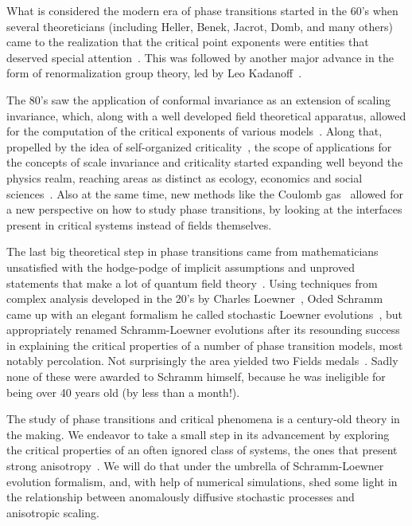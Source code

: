 What is considered the modern era of phase transitions started in the 60's when
several theoreticians (including Heller, Benek, Jacrot, Domb, and many others)
came to the realization that the critical point exponents were entities that
deserved special attention~\cite{Stanley1999, Stanley1971}. This was followed
by another major advance in the form of renormalization group theory, led by
Leo Kadanoff~\cite{Kadanoff1966}.

The 80's saw the application of conformal invariance as an extension of scaling
invariance, which, along with a well developed field theoretical apparatus,
allowed for the computation of the critical exponents of various
models~\cite{Belavin1984, Henkel2013}. Along that, propelled by the idea of
self-organized criticality~\cite{Bak1987}, the scope of applications for the
concepts of scale invariance and criticality started expanding well beyond the
physics realm, reaching areas as distinct as ecology, economics and social
sciences~\cite{Bak1996, Christensen2005}. Also at the same time, new methods
like the Coulomb gas~\cite{Nienhuis1984, Minnhagen1987} allowed for a new
perspective on how to study phase transitions, by looking at the interfaces
present in critical systems instead of fields themselves.

The last big theoretical step in phase transitions came from mathematicians
unsatisfied with the hodge-podge of implicit assumptions and unproved
statements that make a lot of quantum field theory~\cite{Langlands1994,
Cardy2005}. Using techniques from complex analysis developed in the 20's by
Charles Loewner~\cite{Loewner1923}, Oded Schramm came up with an elegant
formalism he called stochastic Loewner evolutions~\cite{Schramm2000}, but
appropriately renamed Schramm-Loewner evolutions after its resounding success
in explaining the critical properties of a number of phase transition models,
most notably percolation. Not surprisingly the area yielded two Fields
medals~\cite{Mackenzie2006, Kesten2010}. Sadly none of these were awarded to
Schramm himself, because he was ineligible for being over 40 years old (by less
than a month!).

The study of phase transitions and critical phenomena is a century-old theory
in the making. We endeavor to take a small step in its advancement by exploring
the critical properties of an often ignored class of systems, the ones that
present strong anisotropy~\cite{Henkel1994}. We will do that under the umbrella
of Schramm-Loewner evolution formalism, and, with help of numerical
simulations, shed some light in the relationship between anomalously diffusive
stochastic processes and anisotropic scaling.

